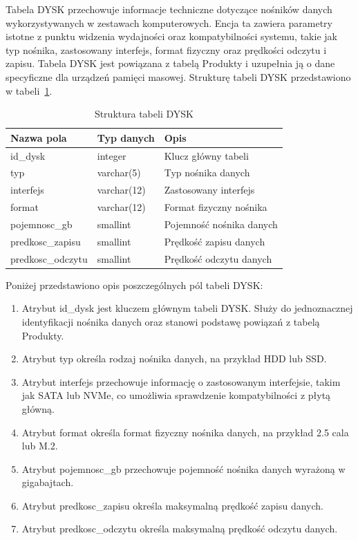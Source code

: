 \documentclass[a4paper,twoside,12pt]{book}
\begin{document}
Tabela DYSK przechowuje informacje techniczne dotyczące nośników danych
wykorzystywanych w zestawach komputerowych. Encja ta zawiera parametry istotne z
punktu widzenia wydajności oraz kompatybilności systemu, takie jak typ nośnika,
zastosowany interfejs, format fizyczny oraz prędkości odczytu i zapisu. Tabela
DYSK jest powiązana z tabelą Produkty i uzupełnia ją o dane specyficzne dla
urządzeń pamięci masowej. Strukturę tabeli DYSK przedstawiono w
tabeli~\ref{tab:dysk}.

\begin{table}[H]
\centering
\caption{Struktura tabeli DYSK}
\label{tab:dysk}
\begin{tabular}{lll}
\hline
Nazwa pola & Typ danych & Opis \\ \hline
id\_dysk & integer & Klucz główny tabeli \\
typ & varchar(5) & Typ nośnika danych \\
interfejs & varchar(12) & Zastosowany interfejs \\
format & varchar(12) & Format fizyczny nośnika \\
pojemnosc\_gb & smallint & Pojemność nośnika danych \\
predkosc\_zapisu & smallint & Prędkość zapisu danych \\
predkosc\_odczytu & smallint & Prędkość odczytu danych \\ \hline
\end{tabular}
\end{table}

Poniżej przedstawiono opis poszczególnych pól tabeli DYSK:

\begin{enumerate}
    \item Atrybut id\_dysk jest kluczem głównym tabeli DYSK. Służy do jednoznacznej
    identyfikacji nośnika danych oraz stanowi podstawę powiązań z tabelą Produkty.

    \item Atrybut typ określa rodzaj nośnika danych, na przykład HDD lub SSD.

    \item Atrybut interfejs przechowuje informację o zastosowanym interfejsie,
    takim jak SATA lub NVMe, co umożliwia sprawdzenie kompatybilności z płytą
    główną.

    \item Atrybut format określa format fizyczny nośnika danych, na przykład 2.5
    cala lub M.2.

    \item Atrybut pojemnosc\_gb przechowuje pojemność nośnika danych wyrażoną w
    gigabajtach.

    \item Atrybut predkosc\_zapisu określa maksymalną prędkość zapisu danych.

    \item Atrybut predkosc\_odczytu określa maksymalną prędkość odczytu danych.
\end{enumerate}
\end{document}
